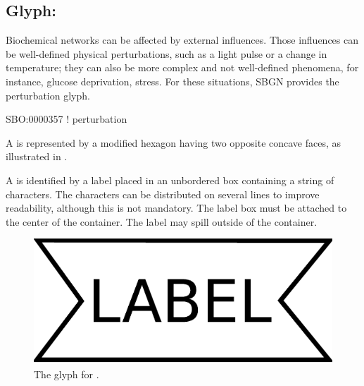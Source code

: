 \subsection{Glyph: }
\label{sec:perturbation}

Biochemical networks can be affected by external influences. Those influences can be well-defined physical perturbations, such as a light pulse or a change in temperature; they can also be more complex and not well-defined phenomena, for instance, glucose deprivation, stress. For these situations, SBGN provides the perturbation glyph. 

\begin{glyphDescription}

\glyphSboTerm SBO:0000357 ! perturbation

\glyphContainer A  is represented by a modified hexagon
having two opposite concave faces, as illustrated in .

\glyphLabel A  is identified by a label placed in an unbordered box containing a string of characters.  The characters can be distributed on several lines to improve readability, although this is not mandatory.  The label box must be attached to the center of the  container.  The label may spill outside of the container.

\end{glyphDescription}

\begin{figure}[H]
  \centering
  \includegraphics[scale=0.3]{images/perturbation}
  \caption{The \AF glyph for .}
  \label{fig:af:perturbation}
\end{figure}
